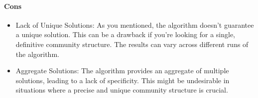\documentclass{article}
\begin{document}
\paragraph{Cons}
\begin{itemize}
    \item Lack of Unique Solutions: As you mentioned, the algorithm doesn't guarantee a unique solution. This can be a drawback if you're looking for a single, definitive community structure. The results can vary across different runs of the algorithm.
    \item Aggregate Solutions: The algorithm provides an aggregate of multiple solutions, leading to a lack of specificity. This might be undesirable in situations where a precise and unique community structure is crucial.
\end{itemize}
\end{document}

